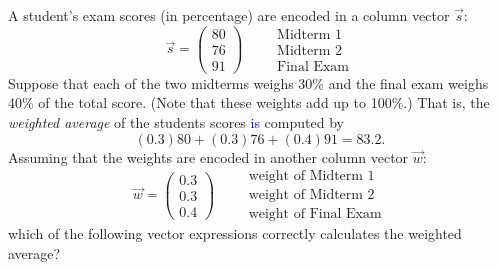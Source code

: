 \documentclass{ximera}
\author{Tae Eun Kim}
\begin{document}
\begin{exercise}
  A student's exam scores (in percentage) are encoded in a column vector $\vec{s}$:
  \[
    \vec{s} =
    \begin{pmatrix}
      80\\ 76\\ 91
    \end{pmatrix}
    \qquad
    \begin{array}{l}
      \text{Midterm 1}\\
      \text{Midterm 2}\\
      \text{Final Exam}
    \end{array}
  \]
  Suppose that each of the two midterms weighs 30\% and the final exam
  weighs 40\% of the total score. (Note that these weights add up to
  100\%.) That is, the \textit{weighted average} of the students
  scores \textcolor{blue}{is} computed by
  \[
    (0.3) 80 + (0.3) 76 + (0.4) 91 = 83.2.
  \]
  Assuming that the weights are encoded in another column vector $\vec{w}$:
  \[
    \vec{w} =
    \begin{pmatrix}
      0.3\\ 0.3\\ 0.4
    \end{pmatrix}
    \qquad
    \begin{array}{l}
      \text{weight of Midterm 1}\\
      \text{weight of Midterm 2}\\
      \text{weight of Final Exam}
    \end{array}
  \]
  which of the following vector expressions correctly calculates the
  weighted average?
  \begin{selectAll}
  \end{selectAll}
\end{exercise}
\end{document}
